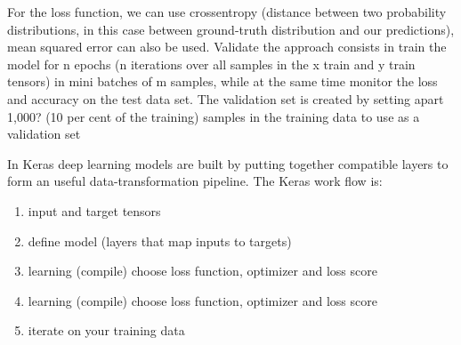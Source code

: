 \documentclass[12pt]{report}
\begin{document}
For the loss function, we can use crossentropy (distance between two probability distributions, in this case between ground-truth distribution and our predictions), mean squared error can also be used.
Validate the approach consists in train the model for n epochs (n iterations over all samples in the x train and y train tensors) in mini batches of m samples, while at the same time monitor the loss and accuracy on the test data set.
The validation set is created by setting apart  1,000? (10 per cent of the training) samples in the training data to use as a validation set

In Keras deep learning models are built by putting together compatible layers to form an useful data-transformation pipeline.  The Keras work flow is:
\begin{enumerate}
\item input and target tensors
\item define model (layers that map inputs to targets)
\item learning (compile) choose loss function, optimizer and loss score 
\item learning (compile) choose loss function, optimizer and loss score 
\item iterate on your training data %

\end{enumerate}

\end{document}
